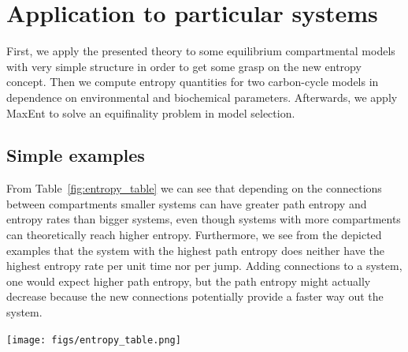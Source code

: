 \documentclass[smallextended]{svjour3}
\begin{document}
 
\section{Application to particular systems}
First, we apply the presented theory to some equilibrium compartmental models with very simple structure in order to get some grasp on the new entropy concept.
Then we compute entropy quantities for two carbon-cycle models in dependence on environmental and biochemical parameters.
Afterwards, we apply MaxEnt to solve an equifinality problem in model selection.

\subsection{Simple examples}
\label{sec:simple_examples}
From Table~\ref{fig:entropy_table} we can see that depending on the connections between compartments smaller systems can have greater path entropy and entropy rates than bigger systems, even though systems with more compartments can theoretically reach higher entropy.
Furthermore, we see from the depicted examples that the system with the highest path entropy does neither have the highest entropy rate per unit time nor per jump.
Adding connections to a system, one would expect higher path entropy, but the path entropy might actually decrease because the new connections potentially provide a faster way out the system.

\begin{table}[htbp]
  \centering
  \texttt{[image: figs/entropy\_table.png]}
  \caption{Overview of different entropy measures of simple models with different structures.
  Underlined numbers are the highest values per column
  }
  \label{fig:entropy_table}
\end{table}
\end{document}
